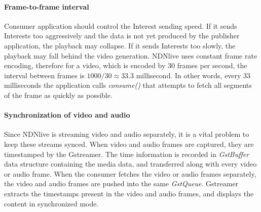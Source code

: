 \paragraph{Frame-to-frame interval}
\vspace{0.1cm}
\label{par:consume_interval}
Consumer application should control the Interest sending speed. If it sends Interests too aggressively and the data is not yet produced by the publisher application, the playback may collapse. If it sends Interests too slowly, the playback may fall behind the video generation. NDNlive uses constant frame rate encoding, therefore for a video, which is encoded by 30 frames per second, the interval between frames is $1000/30 \approx {33.3}$ millisecond. In other words, every 33 milliseconds the application calls \textit{consume()} that attempts to fetch all segments of the frame as quickly as possible.



\paragraph{Synchronization of video and audio}
\vspace{0.1cm}
\label{par:sync}
Since NDNlive is streaming video and audio separately, it is a vital problem to keep these streams synced. When video and audio frames are captured, they are timestamped by the Gstreamer. The time information is recorded in \textit{GstBuffer} data structure containing the media data, and transferred along with every video or audio frame. When the consumer fetches the video or audio frames separately, the video and audio frames are pushed into the same \textit{GstQueue}. Gstreamer extracts the timestamps present in the video and audio frames, and displays the content in synchronized mode. 



